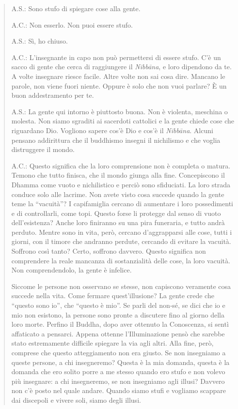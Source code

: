 \begin{quote}
A.S.: Sono stufo di spiegare cose alla gente.

A.C.: Non esserlo. Non puoi essere stufo.

A.S.: Sì, ho chiuso.

A.C.: L'insegnante in capo non può permettersi di essere stufo. C'è un
sacco di gente che cerca di raggiungere il \emph{Nibbāna}, e loro
dipendono da te. A volte insegnare riesce facile. Altre volte non sai
cosa dire. Mancano le parole, non viene fuori niente. Oppure è solo che
non vuoi parlare? È un buon addestramento per te.

A.S.: La gente qui intorno è piuttosto buona. Non è violenta, meschina o
molesta. Non siamo sgraditi ai sacerdoti cattolici e la gente chiede
cose che riguardano Dio. Vogliono sapere cos'è Dio e cos'è il
\emph{Nibbāna}. Alcuni pensano addirittura che il buddhismo insegni il
nichilismo e che voglia distruggere il mondo.

A.C.: Questo significa che la loro comprensione non è completa o matura.
Temono che tutto finisca, che il mondo giunga alla fine. Concepiscono il
Dhamma come vuoto e nichilistico e perciò sono sfiduciati. La loro
strada conduce solo alle lacrime. Non avete visto cosa succede quando la
gente teme la ``vacuità''? I capifamiglia cercano di aumentare i loro
possedimenti e di controllarli, come topi. Questo forse li protegge dal
senso di vuoto dell'esistenza? Anche loro finiranno su una pira
funeraria, e tutto andrà perduto. Mentre sono in vita, però, cercano
d'aggrapparsi alle cose, tutti i giorni, con il timore che andranno
perdute, cercando di evitare la vacuità. Soffrono così tanto? Certo,
soffrono davvero. Questo significa non comprendere la reale mancanza di
sostanzialità delle cose, la loro vacuità. Non comprendendolo, la gente
è infelice.

Siccome le persone non osservano se stesse, non capiscono veramente cosa
succede nella vita. Come fermare quest'illusione? La gente crede che
``questo sono io'', che ``questo è mio''. Se parli del non‑sé, se dici
che io e mio non esistono, la persone sono pronte a discutere fino al
giorno della loro morte. Perfino il Buddha, dopo aver ottenuto la
Conoscenza, si sentì affaticato a pensarci. Appena ottenne
l'Illuminazione pensò che sarebbe stato estremamente difficile spiegare
la via agli altri. Alla fine, però, comprese che questo atteggiamento
non era giusto. Se non insegniamo a queste persone, a chi insegneremo?
Questa è la mia domanda, questa è la domanda che ero solito porre a me
stesso quando ero stufo e non volevo più insegnare: a chi insegneremo,
se non insegniamo agli illusi? Davvero non c'è posto nel quale andare.
Quando siamo stufi e vogliamo scappare dai discepoli e vivere soli,
siamo degli illusi.
\end{quote}

